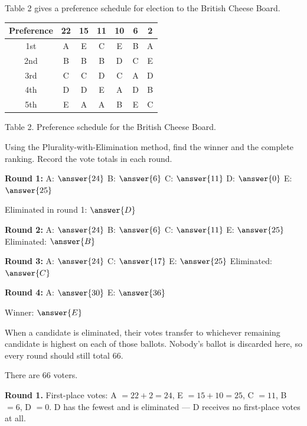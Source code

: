 \documentclass[12pt]{ximera}
\begin{document}
\begin{problem}
Table 2 gives a preference schedule for election to the British Cheese Board.

\begin{center}
\begin{tabular}{c|cccccc}
Preference & 22 & 15 & 11 & 10 & 6 & 2 \\\hline
1st & A & E & C & E & B & A \\
2nd & B & B & B & D & C & E \\
3rd & C & C & D & C & A & D \\
4th & D & D & E & A & D & B \\
5th & E & A & A & B & E & C
\end{tabular}

\smallskip
Table 2. Preference schedule for the British Cheese Board.
\end{center}

\begin{prompt}
Using the Plurality-with-Elimination method, find the winner and the complete ranking.
Record the vote totals in each round.

\textbf{Round 1:}
A: $\answer{24}$ \quad B: $\answer{6}$ \quad C: $\answer{11}$ \quad D: $\answer{0}$ \quad E: $\answer{25}$

\smallskip
Eliminated in round 1: $\answer{D}$

\smallskip
\textbf{Round 2:} A: $\answer{24}$ \quad B: $\answer{6}$ \quad C: $\answer{11}$ \quad E: $\answer{25}$ \qquad
Eliminated: $\answer{B}$

\smallskip
\textbf{Round 3:} A: $\answer{24}$ \quad C: $\answer{17}$ \quad E: $\answer{25}$ \qquad
Eliminated: $\answer{C}$

\smallskip
\textbf{Round 4:} A: $\answer{30}$ \quad E: $\answer{36}$

\smallskip
Winner: $\answer{E}$

\begin{hint}
When a candidate is eliminated, their votes transfer to whichever remaining candidate
is highest on each of those ballots. Nobody's ballot is discarded here, so every round
should still total $66$.
\end{hint}

\begin{feedback}
There are $66$ voters.

\textbf{Round 1.} First-place votes: A $= 22+2 = 24$, E $= 15+10 = 25$, C $= 11$,
B $= 6$, D $= 0$. D has the fewest and is eliminated --- D receives no first-place
votes at all.


\end{feedback}
\end{prompt}
\end{problem}
\end{document}
